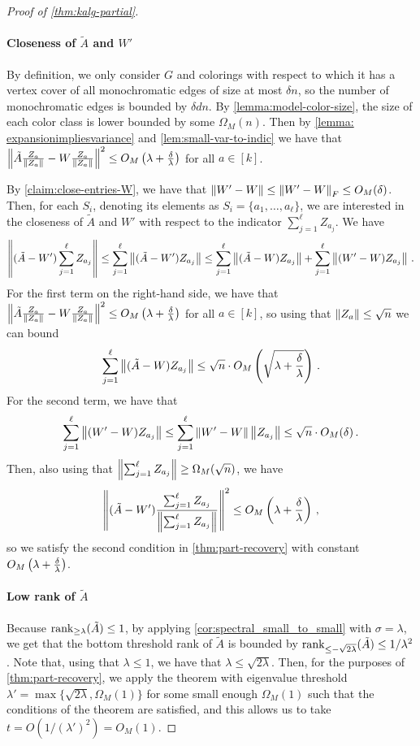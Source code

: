 \begin{proof}[Proof of \cref{thm:kalg-partial}]
    \paragraph{Closeness of $\tilde{A}$ and $W'$}
    By definition, we only consider $G$ and colorings with respect to which it has a vertex cover of all monochromatic edges of size at most $\delta n$, so the number of monochromatic edges is bounded by $\delta d n$.
    By \cref{lemma:model-color-size}, the size of each color class is lower bounded by some $\Omega_M(n)$.
    Then by \cref{lemma: expansionimpliesvariance} and \cref{lem:small-var-to-indic} we have that $\left\lVert\tilde{A} \frac{Z_a}{\left\lVert Z_a\right\rVert} - W \frac{Z_a}{\left\lVert Z_a\right\rVert}\right\rVert^2 \leq O_M\left(\lambda + \frac{\delta}{\lambda}\right)$ for all $a \in [k]$.

    By \cref{claim:close-entries-W}, we have that $\left\lVert W'-W\right\rVert \leq \left\lVert W'-W\right\rVert_F \leq O_M(\delta)$.
    Then, for each $S_i$, denoting its elements as $S_i = \{a_1, \ldots, a_{\ell}\}$, we are interested in the closeness of $\tilde{A}$ and $W'$ with respect to the indicator $\sum_{j=1}^{\ell} Z_{a_j}$.
    We have
    \[\left\lVert(\tilde{A} - W') \sum_{j=1}^{\ell} Z_{a_j}\right\rVert \leq \sum_{j=1}^{\ell} \left\lVert(\tilde{A} - W') Z_{a_j}\right\rVert \leq \sum_{j=1}^{\ell} \left\lVert(\tilde{A} - W) Z_{a_j}\right\rVert + \sum_{j=1}^{\ell}\left\lVert(W'-W)Z_{a_j}\right\rVert\,.\]
    For the first term on the right-hand side, we have that $\left\lVert\tilde{A} \frac{Z_a}{\left\lVert Z_a\right\rVert} - W \frac{Z_a}{\left\lVert Z_a\right\rVert}\right\rVert^2 \leq O_M\left(\lambda + \frac{\delta}{\lambda}\right)$ for all $a \in [k]$, so using that $\left\lVert Z_a\right\rVert \leq \sqrt{n}$ we can bound
    \[\sum_{j=1}^{\ell} \left\lVert(\tilde{A} - W) Z_{a_j}\right\rVert \leq \sqrt{n} \cdot O_M\left(\sqrt{\lambda + \frac{\delta}{\lambda}}\right)\,.\]
    For the second term, we have that
    \[\sum_{j=1}^{\ell} \left\lVert(W'-W)Z_{a_j}\right\rVert \leq \sum_{j=1}^{\ell} \left\lVert W'-W\right\rVert \left\lVert Z_{a_j}\right\rVert \leq \sqrt{n} \cdot O_M(\delta)\,.\]
    Then, also using that $\left\lVert\sum_{j=1}^{\ell} Z_{a_j}\right\rVert \geq \Omega_M(\sqrt{n})$, we have
    \[\left\lVert(\tilde{A} - W') \frac{\sum_{j=1}^{\ell} Z_{a_j}}{\left\lVert\sum_{j=1}^{\ell} Z_{a_j}\right\rVert}\right\rVert^2 \leq O_M \left(\lambda + \frac{\delta}{\lambda}\right)\,,\]
    so we satisfy the second condition in \cref{thm:part-recovery} with constant $O_M \left(\lambda + \frac{\delta}{\lambda}\right)$.

    \paragraph{Low rank of $\tilde{A}$}
    Because $\operatorname{rank}_{\geq \lambda}(\tilde{A}) \leq 1$, by applying \cref{cor:spectral_small_to_small} with $\sigma=\lambda$, we get that the bottom threshold rank of $\tilde{A}$ is bounded by $\operatorname{rank}_{\leq -\sqrt{2\lambda}}(\tilde{A}) \leq 1/\lambda^2$.
    Note that, using that $\lambda \leq 1$, we have that $\lambda \leq \sqrt{2 \lambda}$.
    Then, for the purposes of \cref{thm:part-recovery}, we apply the theorem with eigenvalue threshold $\lambda' = \max\{\sqrt{2\lambda}, \Omega_M(1)\}$ for some small enough $\Omega_M(1)$ such that the conditions of the theorem are satisfied, and this allows us to take $t = O(1/(\lambda')^2) = O_M(1)$.


\end{proof}
